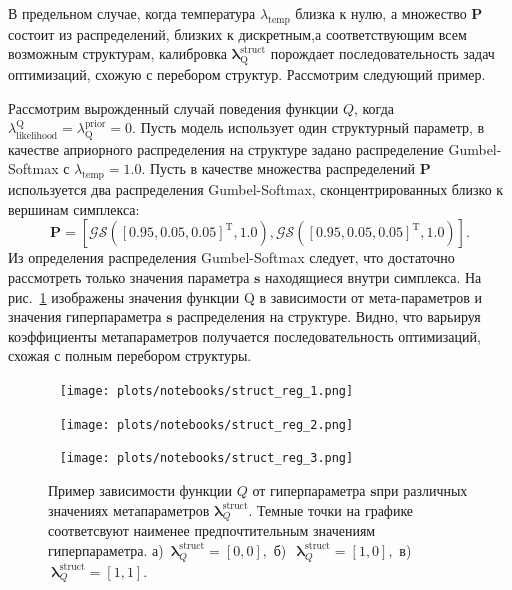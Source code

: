В предельном случае, когда температура $\lambda_\text{temp}$ близка к нулю, а множество $\mathbf{P}$ состоит из распределений, близких к дискретным,а соответствующим всем возможным структурам, калибровка $\boldsymbol{\lambda}^\text{struct}_\text{Q}$ порождает последовательность задач оптимизаций, схожую с перебором структур. Рассмотрим следующий пример. 

\begin{example} 
Рассмотрим вырожденный случай поведения функции $Q$, когда $\lambda_\text{likelihood}^\text{Q} = \lambda^\text{prior}_\text{Q} = 0$. Пусть модель использует один структурный параметр, в качестве априорного распределения на структуре задано распределение Gumbel-Softmax с $\lambda_\text{temp}=1.0$. Пусть в качестве множества распределений $\mathbf{P}$ используется два распределения Gumbel-Softmax, сконцентрированных близко к вершинам симплекса:
\[
    \mathbf{P} = [\mathcal{GS}([0.95, 0.05, 0.05]^\text{T}, 1.0) ,\mathcal{GS}([0.95, 0.05, 0.05]^\text{T}, 1.0)].
\]
Из определения распределения Gumbel-Softmax следует, что достаточно рассмотреть только значения параметра $\mathbf{s}$ находящиеся внутри симплекса.
На рис.~\ref{fig:gs_comb} изображены значения функции Q в зависимости от мета-параметров и значения гиперпараметра $\mathbf{s}$ распределения на структуре. Видно, что варьируя  коэффициенты метапараметров получается последовательность оптимизаций, схожая с полным перебором структуры.
\end{example}


\begin{figure}
 \begin{minipage}[t]{.32\textwidth}
   \texttt{[image: plots/notebooks/struct\_reg\_1.png]}
\subcaption{}
\end{minipage}
\hfill
 \begin{minipage}[t]{.32\textwidth}
   \texttt{[image: plots/notebooks/struct\_reg\_2.png]}
\subcaption{}
\end{minipage}
\hfill
 \begin{minipage}[t]{.32\textwidth}
   \texttt{[image: plots/notebooks/struct\_reg\_3.png]}
\subcaption{}
\end{minipage}

\caption{Пример зависимости функции $Q$ от гиперпараметра $\mathbf{s}$при различных значениях метапараметров $\boldsymbol{\lambda}^\text{struct}_Q$. Темные точки на графике соответсвуют наименее предпочтительным значениям гиперпараметра. а)~$\boldsymbol{\lambda}^\text{struct}_Q = [0,0],$ б)~$~\boldsymbol{\lambda}^\text{struct}_Q = [1,0],$ в)~$~\boldsymbol{\lambda}^\text{struct}_Q = [1,1].$}
\label{fig:gs_comb}

\end{figure}

